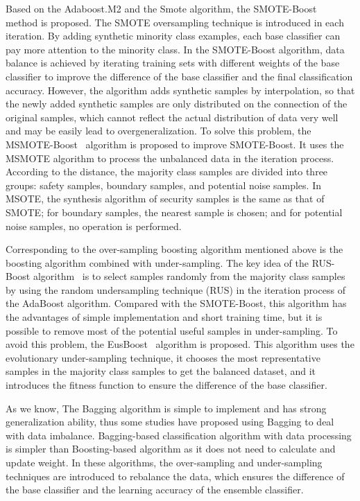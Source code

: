 Based on the Adaboost.M2 and the Smote algorithm, the SMOTE-Boost~\cite{ref_3} method is proposed. The SMOTE oversampling technique is introduced in each iteration. By adding synthetic minority class examples, each base classifier can pay more attention to the minority class. In the SMOTE-Boost algorithm, data balance is achieved by iterating training sets with different weights of the base classifier to improve the difference of the base classifier and the final classification accuracy. However, the algorithm adds synthetic samples by interpolation, so that the newly added synthetic samples are only distributed on the connection of the original samples, which cannot reflect the actual distribution of data very well and may be easily lead to overgeneralization. To solve this problem, the MSMOTE-Boost~\cite{ref_8} algorithm is proposed to improve SMOTE-Boost. It uses the MSMOTE algorithm to process the unbalanced data in the iteration process. According to the distance, the majority class samples are divided into three groups: safety samples, boundary samples, and potential noise samples. In MSOTE, the synthesis algorithm of security samples is the same as that of SMOTE; for boundary samples, the nearest sample is chosen; and for potential noise samples, no operation is performed.

Corresponding to the over-sampling boosting algorithm mentioned above is the boosting algorithm combined with under-sampling. The key idea of the RUS-Boost algorithm~\cite{ref_20} is to select samples randomly from the majority class samples by using the random undersampling technique (RUS) in the iteration process of the AdaBoost algorithm. Compared with the SMOTE-Boost, this algorithm has the advantages of simple implementation and short training time, but it is possible to remove most of the potential useful samples in under-sampling. To avoid this problem, the EusBoost~\cite{ref_21} algorithm is proposed. This algorithm uses the evolutionary under-sampling technique, it chooses the most representative samples in the majority class samples to get the balanced dataset, and it introduces the fitness function to ensure the difference of the base classifier.

As we know, The Bagging algorithm is simple to implement and has strong generalization ability, thus some studies have proposed using Bagging to deal with data imbalance. Bagging-based classification algorithm with data processing is simpler than Boosting-based algorithm as it does not need to calculate and update weight. In these algorithms, the over-sampling and under-sampling techniques are introduced to rebalance the data, which ensures the difference of the base classifier and the learning accuracy of the ensemble classifier.

